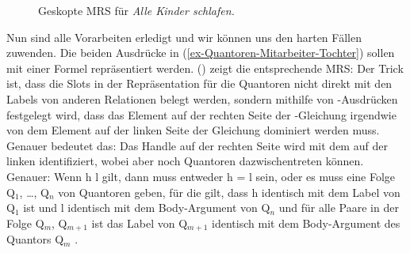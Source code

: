 \begin{figure}
\caption{Geskopte MRS für \emph{Alle Kinder schlafen.}}\label{fig-Alle Kinder
  schlafen-scoped MRS}
\end{figure}

Nun sind alle Vorarbeiten erledigt und wir können uns den harten Fällen zuwenden. Die beiden
Ausdrücke in (\ref{ex-Quantoren-Mitarbeiter-Tochter}) sollen mit einer Formel repräsentiert
werden. () zeigt die entsprechende MRS:
\ea
\label{ex-Jede Tochter eines Mitarbeiters schläft-MRS}
\z
Der Trick ist, dass die Slots in der Repräsentation für die Quantoren nicht direkt mit den Labels
von anderen Relationen belegt werden, sondern mithilfe von \qeq-Ausdrücken festgelegt wird, dass das
Element auf der rechten Seite der \qeq-Gleichung irgendwie von dem Element auf der linken Seite der
Gleichung dominiert werden muss. Genauer bedeutet das: Das Handle auf der rechten Seite wird mit dem
auf der linken identifiziert, wobei aber noch Quantoren dazwischentreten können. Genauer: Wenn h
\qeq l gilt, dann muss entweder h = l sein, oder es muss eine Folge Q$_1$, \ldots, Q$_n$ von
Quantoren geben, für die gilt, dass h identisch mit dem Label von Q$_1$ ist und l identisch mit dem
Body-Argument von Q$_n$ und für alle Paare in der Folge Q$_m$, Q$_{m+1}$ ist das Label von Q$_{m+1}$
identisch mit dem Body-Argument des Quantors Q$_m$ \citep[]{MRS}.  


